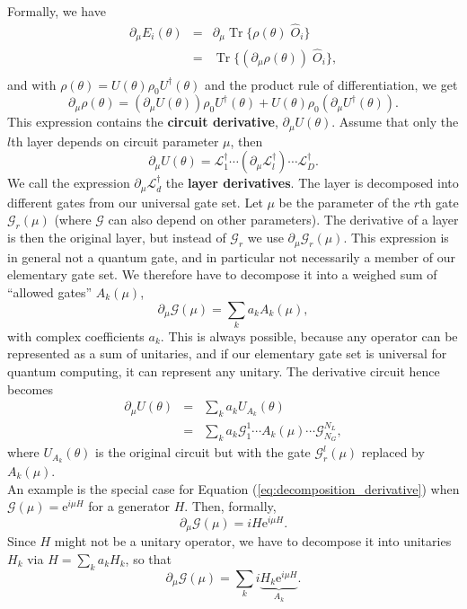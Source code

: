 \documentclass[amsmath,amssymb,aps,pra,10pt,twocolumn,groupedaddress,nofootinbib]{revtex4-1}
\DeclareMathOperator{\tr}{Tr}
\newcommand{\e}{\mathrm{e}}
\newcommand{\G}{\mathcal{G}}
\begin{document}
Formally, we have
\begin{eqnarray*}
        \partial_{\mu} E_i(\theta) &=& \partial_{\mu} \tr \{\rho(\theta) \; \hat{O}_i\} \\
        &=& \tr \{ (\partial_{\mu}  \rho(\theta)) \; \hat{O}_i\}, \\
\end{eqnarray*}
and with $\rho(\theta) = U(\theta)\rho_0U^{\dagger}(\theta)$ and the product rule of differentiation, we get
\[\partial_{\mu}  \rho(\theta) = \left(\partial_{\mu}   U(\theta)\right) \rho_0U^{\dagger}(\theta) +   U(\theta) \rho_0 \left(\partial_{\mu} U^{\dagger}(\theta)\right)   . \]
This expression contains the \textbf{circuit derivative},
$\partial_{\mu}  U(\theta)$. Assume that only the $l$th layer depends
on circuit parameter $\mu$, then
\[
\partial_{\mu}  U(\theta) =  \mathcal{L}_1^{\dagger} \cdots (\partial_{\mu} \mathcal{L}_l^{\dagger})\cdots \mathcal{L}_D^{\dagger}.
\]
We call the expression $\partial_{\mu} \mathcal{L}_d^{\dagger}$  the
\textbf{layer derivatives}. The layer is decomposed into different
gates from our universal gate set. Let $\mu$ be the parameter of the
$r$th gate $\G_r(\mu)$ (where $\G$ can also depend on other
parameters). The derivative of a layer is then the original layer, but
instead of $\G_r$ we use $\partial_{\mu} \G_r(\mu)$. This expression
is in general not a quantum gate, and in particular not necessarily a
member of our elementary gate set. We therefore have to decompose it
into a weighed sum of ``allowed gates'' $A_k(\mu)$,
\begin{equation}
        \partial_{\mu} \G(\mu) = \sum_k a_k A_k(\mu),
    \label{eq:decomposition_derivative}
\end{equation}
with complex coefficients $a_k$. This is always possible, because any
operator can be represented as a sum of unitaries, and if our
elementary gate set is universal for quantum computing, it can
represent any unitary. The derivative circuit hence becomes
\begin{eqnarray}
\partial_{\mu}  U(\theta)  &=& \sum_k a_k U_{A_k}(\theta) \\
&=& \sum_k a_k \G_1^1 \cdots A_k(\mu) \cdots \G_{N_G}^{N_L},
\end{eqnarray}
where $U_{A_k}(\theta)$ is the original circuit but with the gate $\G_r^l(\mu)$ replaced by $A_k(\mu)$. \\



An example is the special case for Equation (\ref{eq:decomposition_derivative}) when $\G(\mu) = \e^{i\mu H}$ for a generator $H$. Then, formally,
\[
\partial_{\mu}\G(\mu) = i H \e^{i\mu H}.
\]
Since $H$ might not be a unitary operator, we have to decompose it into unitaries $H_k$ via $H = \sum_k a_k H_k$, so that
\[
\partial_{\mu}\G(\mu) = \sum_k i \underbrace{H_k \e^{i\mu H}}_{A_k}.
\]
\end{document}
